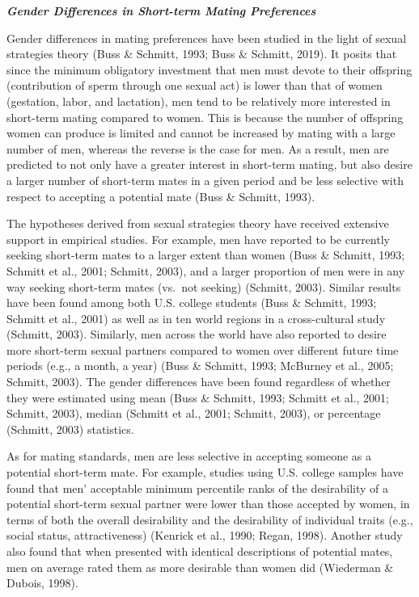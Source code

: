 \documentclass[
  12pt,
]{article}
\begin{document}
\textbf{\emph{Gender Differences in Short-term Mating Preferences}}

Gender differences in mating preferences have been studied in the light
of sexual strategies theory (Buss \& Schmitt, 1993; Buss \& Schmitt,
2019). It posits that since the minimum obligatory investment that men
must devote to their offspring (contribution of sperm through one sexual
act) is lower than that of women (gestation, labor, and lactation), men
tend to be relatively more interested in short-term mating compared to
women. This is because the number of offspring women can produce is
limited and cannot be increased by mating with a large number of men,
whereas the reverse is the case for men. As a result, men are predicted
to not only have a greater interest in short-term mating, but also
desire a larger number of short-term mates in a given period and be less
selective with respect to accepting a potential mate (Buss \& Schmitt,
1993).

The hypotheses derived from sexual strategies theory have received
extensive support in empirical studies. For example, men have reported
to be currently seeking short-term mates to a larger extent than women
(Buss \& Schmitt, 1993; Schmitt et al., 2001; Schmitt, 2003), and a
larger proportion of men were in any way seeking short-term mates
(vs.~not seeking) (Schmitt, 2003). Similar results have been found among
both U.S. college students (Buss \& Schmitt, 1993; Schmitt et al., 2001)
as well as in ten world regions in a cross-cultural study (Schmitt,
2003). Similarly, men across the world have also reported to desire more
short-term sexual partners compared to women over different future time
periods (e.g., a month, a year) (Buss \& Schmitt, 1993; McBurney et al.,
2005; Schmitt, 2003). The gender differences have been found regardless
of whether they were estimated using mean (Buss \& Schmitt, 1993;
Schmitt et al., 2001; Schmitt, 2003), median (Schmitt et al., 2001;
Schmitt, 2003), or percentage (Schmitt, 2003) statistics.

As for mating standards, men are less selective in accepting someone as
a potential short-term mate. For example, studies using U.S. college
samples have found that men' acceptable minimum percentile ranks of the
desirability of a potential short-term sexual partner were lower than
those accepted by women, in terms of both the overall desirability and
the desirability of individual traits (e.g., social status,
attractiveness) (Kenrick et al., 1990; Regan, 1998). Another study also
found that when presented with identical descriptions of potential
mates, men on average rated them as more desirable than women did
(Wiederman \& Dubois, 1998).
\end{document}
